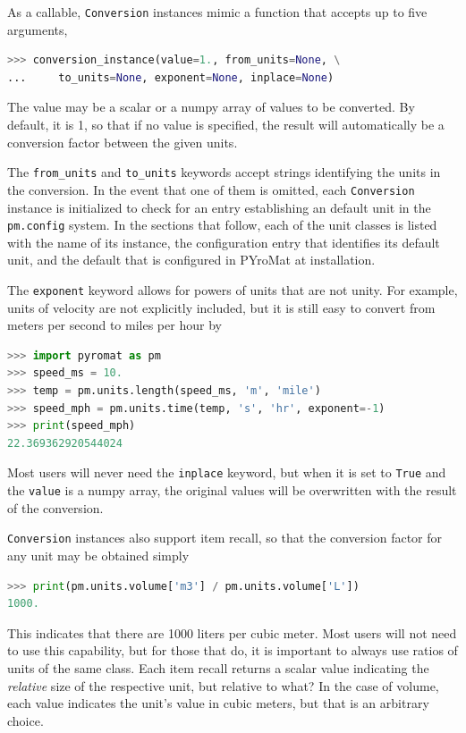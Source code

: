 As a callable, \verb|Conversion| instances mimic a function that accepts up to five arguments,
\begin{lstlisting}[language=Python]
>>> conversion_instance(value=1., from_units=None, \
...     to_units=None, exponent=None, inplace=None)
\end{lstlisting}

The value may be a scalar or a numpy array of values to be converted.  By default, it is 1, so that if no value is specified, the result will automatically be a conversion factor between the given units.

The \verb|from_units| and \verb|to_units| keywords accept strings identifying the units in the conversion.  In the event that one of them is omitted, each \verb|Conversion| instance is initialized to check for an entry establishing an default unit in the \verb|pm.config| system.  In the sections that follow, each of the unit classes is listed with the name of its instance, the configuration entry that identifies its default unit, and the default that is configured in PYroMat at installation.

The \verb|exponent| keyword allows for powers of units that are not unity.  For example, units of velocity are not explicitly included, but it is still easy to convert from meters per second to miles per hour by
\begin{lstlisting}[language=Python]
>>> import pyromat as pm
>>> speed_ms = 10.
>>> temp = pm.units.length(speed_ms, 'm', 'mile')
>>> speed_mph = pm.units.time(temp, 's', 'hr', exponent=-1)
>>> print(speed_mph)
22.369362920544024
\end{lstlisting}

Most users will never need the \verb|inplace| keyword, but when it is set to \verb|True| and the \verb|value| is a numpy array, the original values will be overwritten with the result of the conversion.  

\verb|Conversion| instances also support item recall, so that the conversion factor for any unit may be obtained simply
\begin{lstlisting}[language=Python]
>>> print(pm.units.volume['m3'] / pm.units.volume['L'])
1000.
\end{lstlisting}
This indicates that there are 1000 liters per cubic meter.  Most users will not need to use this capability, but for those that do, it is important to always use ratios of units of the same class.  Each item recall returns a scalar value indicating the \emph{relative} size of the respective unit, but relative to what?  In the case of volume, each value indicates the unit's value in cubic meters, but that is an arbitrary choice.

